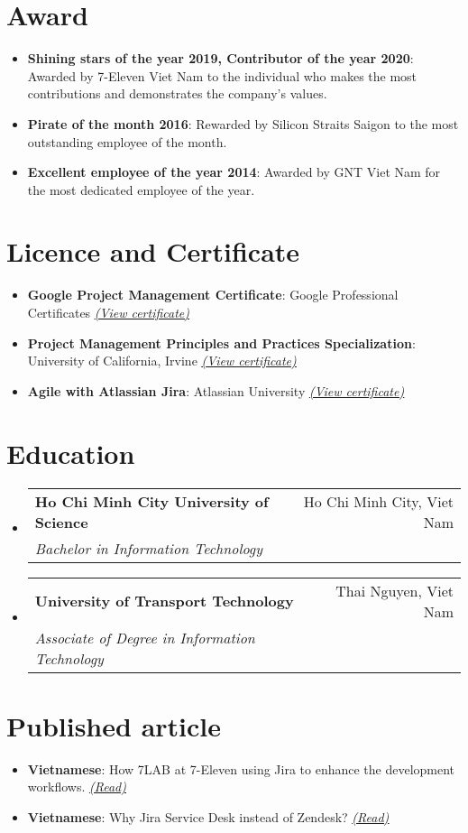 \documentclass[letterpaper,11pt]{article}
\makeatletter
\newcommand{\resumeItem}[2]{
  \item\small{
    \textbf{#1}{: #2 \vspace{-2pt}}
  }
}
\newcommand{\resumeSubheading}[4]{
  \vspace{-1pt}\item
    \begin{tabular*}{0.97\textwidth}[t]{l@{\extracolsep{\fill}}r}
      \textbf{#1} & #2 \\
      \textit{\small#3} & \textit{\small #4} \\
    \end{tabular*}\vspace{-5pt}
}
\newcommand{\resumeSubItem}[2]{\resumeItem{#1}{#2}\vspace{-4pt}}
\newcommand{\resumeSubHeadingListStart}{\begin{itemize}[leftmargin=*]}
\newcommand{\resumeSubHeadingListEnd}{\end{itemize}}
\makeatother
\begin{document}
\section{Award}
  \resumeSubHeadingListStart
    \resumeSubItem{Shining stars of the year 2019, Contributor of the year 2020}
        {Awarded by 7-Eleven Viet Nam to the individual who makes the most contributions and demonstrates the company's values.}
    \resumeSubItem{Pirate of the month 2016}
        {Rewarded by Silicon Straits Saigon to the most outstanding employee of the month.}
    \resumeSubItem{Excellent employee of the year 2014}
        {Awarded by GNT Viet Nam for the most dedicated employee of the year.}
  \resumeSubHeadingListEnd
  

\section{Licence and Certificate}
  \resumeSubHeadingListStart
    \resumeSubItem{Google Project Management Certificate}
      {Google Professional Certificates} \href{https://www.coursera.org/account/accomplishments/specialization/certificate/HUB6LA4G4WHF}{\underline{\textit{(View certificate)}}}
    \resumeSubItem{Project Management Principles and Practices Specialization}
      {University of California, Irvine}\href{https://www.coursera.org/account/accomplishments/specialization/certificate/T7KQFGHZX4J2}{\underline{\textit{(View certificate)}}}
    \resumeSubItem{Agile with Atlassian Jira}
      {Atlassian University}\href{https://www.coursera.org/account/accomplishments/certificate/K3PXCZCWU8FV}{\underline{\textit{(View certificate)}}}
  \resumeSubHeadingListEnd


\section{Education}
  \resumeSubHeadingListStart
    \resumeSubheading
      {Ho Chi Minh City University of Science}{Ho Chi Minh City, Viet Nam}
      {Bachelor in Information Technology}{}
    \resumeSubheading
      {University of Transport Technology}{Thai Nguyen, Viet Nam}
      {Associate of Degree in Information Technology}{}
  \resumeSubHeadingListEnd


\section{Published article}
  \resumeSubHeadingListStart
    \resumeSubItem{Vietnamese}
        {How 7LAB at 7-Eleven using Jira to enhance the development workflows. }\href{https://medium.com/7-lab/bddb5245a522}{\underline{\textit{(Read)}}}
    \resumeSubItem{Vietnamese}
        {Why Jira Service Desk instead of Zendesk?}\href{https://medium.com/7-lab/b664667aa90d}{\underline{\textit{(Read)}}}
  \resumeSubHeadingListEnd


\end{document}
